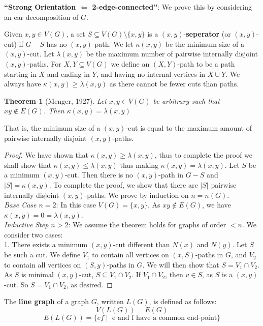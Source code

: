 \documentclass{Book}
\newtheorem{theorem}{Theorem}
\begin{document}
\textbf{``Strong Orientation \(\Leftarrow\) 2-edge-connected''}: We prove this by considering an ear decomposition of $G$.

Given $x, y \in V(G)$, a set $S \subseteq V(G) \setminus \{x,y\}$ is a $(x,y)$-\textbf{seperator} (or $(x,y)$-cut) if $G-S$ has no $(x,y)$-path. We let $\kappa(x,y)$ be the minimum size of a $(x,y)$-cut. Let \(\lambda(x,y)\) be the maximum number of pairwise internally disjoint $(x,y)$-paths. For $X, Y \subseteq V(G)$ we define an $(X,Y)$-path to be a path starting in $X$ and ending in $Y$, and having no internal vertices in $X \cup Y$. We always have \(\kappa(x,y) \ge \lambda(x,y)\) as there cannot be fewer cuts than paths.

\begin{theorem}[Menger, 1927]
	\label{the:menger}
	Let $x,y \in V(G)$ be arbitrary such that $xy \notin E(G)$. Then \(\kappa(x,y) = \lambda(x,y)\)
\end{theorem}

That is, the minimum size of a $(x,y)$-cut is equal to the maximum amount of pairwise internally disjoint $(x,y)$-paths.

\begin{proof}
	We have shown that \(\kappa(x,y) \ge \lambda(x,y)\), thus to complete the proof we shall show that $\kappa(x,y) \le \lambda(x,y)$ thus making \(\kappa(x,y) = \lambda(x,y)\). Let $S$ be a minimum $(x,y)$-cut. Then there is no $(x,y)$-path in $G-S$ and $|S| = \kappa(x,y)$. To complete the proof, we show that there are $|S|$ pairwise internally disjoint $(x,y)$-paths. We prove by induction on $n = n(G)$.\\
	\noindent
	\textit{Base Case $n = 2$}: In this case $V(G) = \{x,y\}$. As $xy \notin E(G)$, we have $\kappa(x,y) = 0 = \lambda(x,y)$.\\
	\noindent
	\textit{Inductive Step $n > 2$}: We assume the theorem holds for graphs of order $< n$. We consider two cases:\\
	1. There exists  a minimum $(x,y)$-cut different than $N(x)$ and $N(y)$. Let $S$ be such a cut. We define $V_{1}$ to contain all vertices on $(x,S)$-paths in $G$, and $V_{2}$ to contain all vertices on $(S,y)$-paths in $G$. We will then show that $S = V_{1} \cap V_{2}$. As $S$ is minimal $(x,y)$-cut, $S \subseteq V_{1} \cap V_{2}$. If $V_{1} \cap V_{2}$, then $v \in S$, as $S$ is a $(x,y)$-cut. So $S = V_{1} \cap V_{2}$, as desired.
\end{proof}


The \textbf{line graph} of a graph $G$, written $L(G)$, is defined as follows:
\begin{equation*}
	V(L(G)) = E(G)
\end{equation*}
\begin{equation*}
	E(L(G)) = \{ef \mid \text{ e and f  have a common end-point}\}
\end{equation*}
\end{document}
